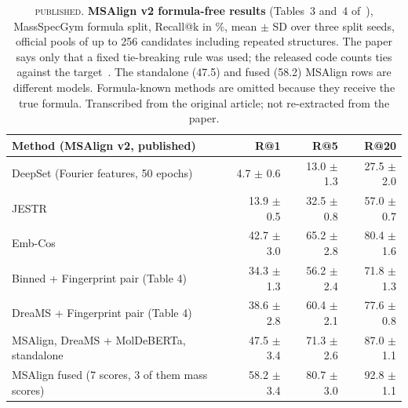 \documentclass[11pt]{article}
\newcommand{\lab}[1]{\textsc{#1}}
\begin{document}
\begin{table}[tbp]
\centering
\footnotesize
\caption{\lab{published}. \textbf{MSAlign v2 formula-free results} (Tables~3 and~4 of~\citep{krzakala2026msalignv2}),
MassSpecGym formula split, Recall@k in \%, mean $\pm$ SD over three split seeds, official pools of up to 256 candidates
including repeated structures. The paper says only that a fixed tie-breaking rule was used; the released code counts
ties against the target~\citep{msalign_readme}. The standalone (47.5) and fused (58.2) MSAlign rows are different
models. Formula-known methods are omitted because they receive the true formula. Transcribed from the original
article; not re-extracted from the paper.}
\label{tab:published}
\begin{tabular}{@{}l r r r@{}}
\toprule
Method (MSAlign v2, published) & R@1 & R@5 & R@20 \\
\midrule
DeepSet (Fourier features, 50 epochs) & 4.7 $\pm$ 0.6 & 13.0 $\pm$ 1.3 & 27.5 $\pm$ 2.0 \\
JESTR & 13.9 $\pm$ 0.5 & 32.5 $\pm$ 0.8 & 57.0 $\pm$ 0.7 \\
Emb-Cos & 42.7 $\pm$ 3.0 & 65.2 $\pm$ 2.8 & 80.4 $\pm$ 1.6 \\
Binned + Fingerprint pair (Table 4) & 34.3 $\pm$ 1.3 & 56.2 $\pm$ 2.4 & 71.8 $\pm$ 1.3 \\
DreaMS + Fingerprint pair (Table 4) & 38.6 $\pm$ 2.8 & 60.4 $\pm$ 2.1 & 77.6 $\pm$ 0.8 \\
MSAlign, DreaMS + MolDeBERTa, standalone & 47.5 $\pm$ 3.4 & 71.3 $\pm$ 2.6 & 87.0 $\pm$ 1.1 \\
MSAlign fused (7 scores, 3 of them mass scores) & 58.2 $\pm$ 3.4 & 80.7 $\pm$ 3.0 & 92.8 $\pm$ 1.1 \\
\bottomrule
\end{tabular}
\end{table}
\end{document}
